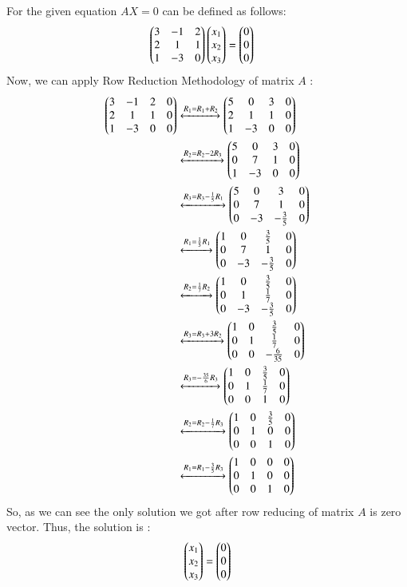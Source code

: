 For the given equation $AX = 0$ can be defined as follows:
\begin{align}\label{eq:solutions/1/2/2/eq_1}
    \begin{pmatrix}3 & -1 & 2 \\
                2 & 1 & 1 \\
                1 & -3 & 0\end{pmatrix}
    \begin{pmatrix}x_1 \\ x_2 \\ x_3\end{pmatrix} &=
    \begin{pmatrix}0 \\ 0 \\ 0\end{pmatrix}
\end{align}
Now, we can apply Row Reduction Methodology of matrix $A$ :
\begin{align}
\begin{pmatrix}3&-1&2&0\\2&1&1&0\\1&-3&0&0\end{pmatrix} 
&\xleftrightarrow{R_1 
= R_1+R_2}\begin{pmatrix}5&0&3&0\\2&1&1&0\\1&-3&0&0\end{pmatrix}\\
&\xleftrightarrow{R_2 = R_2-2R_3}\begin{pmatrix}5&0&3&0\\0&7&1&0\\1&-3&0&0\end{pmatrix}\\
&\xleftrightarrow{R_3 = 
R_3 -\frac{1}{5}R_1}\begin{pmatrix}5&0&3&0\\0&7&1&0\\0&-3&-\frac{3}{5}&0\end{pmatrix}\\
&\xleftrightarrow{R_1 =  \frac{1}{5}R_1}\begin{pmatrix}1&0&\frac{3}{5}&0\\0&7&1&0\\0&-3&-\frac{3}{5}&0\end{pmatrix}\\
&\xleftrightarrow{R_2 = \frac{1}{7}R_2}\begin{pmatrix}1&0&\frac{3}{5}&0\\0&1&\frac{1}{7}&0\\0&-3&-\frac{3}{5}&0\end{pmatrix}\\
&\xleftrightarrow{R_3 = R_3 + 3R_2}\begin{pmatrix}1&0&\frac{3}{5}&0\\0&1&\frac{1}{7}&0\\0&0&-\frac{6}{35}&0\end{pmatrix}\\
&\xleftrightarrow{R_3 = -\frac{35}{6} R_3}\begin{pmatrix}1&0&\frac{3}{5}&0\\0&1&\frac{1}{7}&0\\0&0&1&0\end{pmatrix} \\
&\xleftrightarrow{R_2 = R_2 - \frac{1}{7} R_3}\begin{pmatrix}1&0&\frac{3}{5}&0\\0&1&0&0\\0&0&1&0\end{pmatrix} \\
&\xleftrightarrow{R_1 = R_1 - \frac{3}{5} R_3}\begin{pmatrix}1&0&0&0\\0&1&0&0\\0&0&1&0\end{pmatrix} 
\end{align} 
So, as we can see the only solution we got after row reducing of matrix $A$ is zero vector.
Thus, the solution is :
\begin{align}
    \begin{pmatrix}x_1 \\ x_2 \\ x_3\end{pmatrix} = \begin{pmatrix}0 \\ 0 \\ 0\end{pmatrix}
\end{align}

